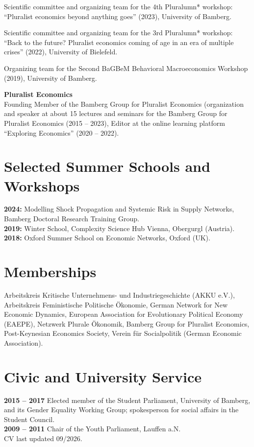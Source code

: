 \documentclass[margin]{res}
\begin{document}
\begin{resume}
	
	Scientific committee and organizing team for the 4th Pluralumn* workshop: ``Pluralist economics beyond anything goes'' (2023), University of Bamberg. 
	
	
	Scientific committee and organizing team for the 3rd Pluralumn* workshop: ``Back to the future? Pluralist economics coming of age in an era of multiple crises'' (2022), University of Bielefeld. 
	
	Organizing team for the Second BaGBeM Behavioral Macroeconomics Workshop (2019), University of Bamberg.
	
	\textbf{Pluralist Economics}\\
	Founding Member of the Bamberg Group for Pluralist Economics
	(organization and speaker at about 15 lectures and seminars for the Bamberg Group for Pluralist Economics  (2015 -- 2023), Editor at the online learning platform ``Exploring Economics'' (2020 -- 2022).\\
	
	
	\section{Selected Summer Schools and Workshops}
	\textbf{2024:} Modelling Shock Propagation and Systemic Risk in Supply Networks, Bamberg Doctoral Research Training Group.\\
	\textbf{2019:} Winter School, Complexity Science Hub Vienna, Obergurgl (Austria).\\
	\textbf{2018:} Oxford Summer School on Economic Networks, Oxford (UK).\\
	
	\section{Memberships}
	Arbeitskreis Kritische Unternehmens- und Industriegeschichte (AKKU e.V.), Arbeitskreis Feministische Politische \"Okonomie, German Network for New Economic Dynamics, European Association for Evolutionary Political Economy (EAEPE), Netzwerk Plurale \"Okonomik, Bamberg Group for Pluralist Economics, Post-Keynesian Economics Society, Verein f\"ur Socialpolitik (German Economic Association).\\
	
	\section{Civic and University Service}
	\textbf{2015 -- 2017} Elected member of the Student Parliament, University of Bamberg, and its Gender Equality Working Group; spokesperson for social affairs in the Student Council.\\
	\textbf{2009 -- 2011} Chair of the Youth Parliament, Lauffen a.N.\\
	
	\enlargethispage{3\baselineskip}
	\hfill CV last updated 09/2026.
\end{resume}
\end{document}
